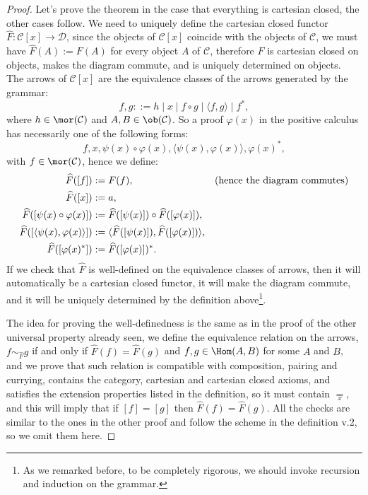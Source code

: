 \begin{proof}
    Let's prove the theorem in the case that everything is cartesian closed, the other cases follow. We need to uniquely define the cartesian closed functor $\widehat F : \mathcal C[x] \to \mathcal D$,
    since the objects of $\mathcal C[x]$ coincide with the objects of $\mathcal C$, we must have $\widehat F(A) := F(A)$ for every object $A$ of $\mathcal C$, therefore $\widehat F$ is cartesian closed on objects, makes the diagram commute, and is uniquely determined on objects.\\
    The arrows of $\mathcal C[x]$ are the equivalence classes of the arrows generated by the grammar:
    \[ f,g ::= h \mid x \mid f \circ g \mid \langle f,g\rangle \mid f^*,\]
    where $h \in \mor(\mathcal C)$ and $A,B \in \ob(\mathcal C)$. So a proof $\varphi(x)$ in the positive calculus has necessarily one of the following forms:
    \[ f,x,\psi(x) \circ \varphi(x), \langle \psi(x), \varphi(x)\rangle, \varphi(x)^*, \]
    with $f \in \mor(\mathcal C)$, hence we define:
    \begin{align*}
        \widehat F([f]) &:= F(f), &&(\textnormal{hence the diagram commutes})\\
        \widehat F([x]) &:= a, \\
        \widehat F([\psi(x) \circ \varphi(x)]) &:= \widehat F([\psi(x)]) \circ \widehat F([\varphi(x)]), \\
        \widehat F([\langle \psi(x), \varphi(x)\rangle]) &:= \langle \widehat F([\psi(x)]), \widehat F([\varphi(x)])\rangle, \\
        \widehat F([\varphi(x)^*]) &:= \widehat F([\varphi(x)])^*.
    \end{align*}
    If we check that $\widehat F$ is well-defined on the equivalence classes of arrows, then it will automatically be a cartesian closed functor, it will make the diagram commute, and it will be uniquely determined by the definition above\footnote{As we remarked before, to be completely rigorous, we should invoke recursion and induction on the grammar.}.\par
    The idea for proving the well-definedness is the same as in the proof of the other universal property already seen, we define the equivalence relation on the arrows, $f \sim_{\widehat F} g$ if and only if $\widehat F(f) = \widehat F(g)$ and $f,g \in \Hom(A,B)$ for some $A$ and $B$, and we prove that such relation is compatible with composition, pairing and currying, contains the category, cartesian and cartesian closed axioms, and satisfies the extension properties listed in the definition,
    so it must contain $\underset{x}{=}$, and this will imply that if $[f] = [g]$ then $\widehat F(f) = \widehat F(g)$. All the checks are similar to the ones in the other proof and follow the scheme in the definition v.2, so we omit them here. 
\end{proof}

